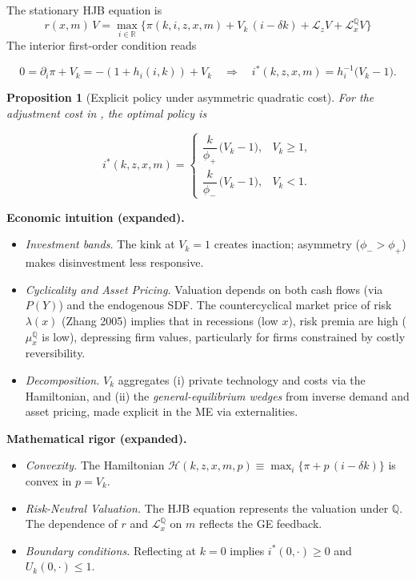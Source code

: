 \documentclass[11pt,letterpaper,oneside]{article}
\providecommand{\ac}[1]{#1}%
\newtheorem{propositionT}{Proposition}
\newenvironment{proposition}[2]{\begin{propositionT}[#1]\label{prop:#2}}{\end{propositionT}}
\newcommand{\R}{\mathbb{R}}
\newcommand{\Lz}{\mathcal{L}_z}
\newcommand{\LxQ}{\mathcal{L}_x^{\mathbb{Q}}}
\newcommand{\muxQ}{\mu_x^{\mathbb{Q}}}
\newcommand{\extbf}[1]{\textbf{#1}}
\begin{document}
The stationary \ac{HJB} equation is
\begin{equation}
\boxed{\; r(x,m)\,V
  = \max_{i\in\R} \Big\{ \pi(k,i,z,x,m) + V_k\,(i-\delta k) + \Lz V + \LxQ V \Big\} \;}
\tag{HJB}\label{eq:HJB}
\end{equation}
The interior first-order condition reads

$$
0=\partial_i\pi+V_k=-(1+h_i(i,k))+V_k
\quad\Longrightarrow\quad
i^*(k,z,x,m)=h_i^{-1}\!\big(V_k-1\big).
$$

\begin{proposition}{Explicit policy under asymmetric quadratic cost}{policy}
For the adjustment cost in , the optimal policy is

$$
i^*(k,z,x,m)=
\begin{cases}
\dfrac{k}{\phi_+}\,\big(V_k-1\big), & V_k\ge 1,\\[6pt]
\dfrac{k}{\phi_-}\,\big(V_k-1\big), & V_k< 1.
\end{cases}
$$
\end{proposition}

\begin{tcolorbox}[didacticstyle]
  \extbf{Economic intuition (expanded).}
\begin{itemize}[leftmargin=1.15em,itemsep=0.25em]
  \item \emph{Investment bands.} The kink at $V_k=1$ creates inaction; asymmetry ($\phi_->\phi_+$) makes disinvestment less responsive.
  \item \emph{Cyclicality and Asset Pricing.} Valuation depends on both cash flows (via $P(Y)$) and the endogenous SDF. The countercyclical market price of risk $\lambda(x)$ (Zhang 2005) implies that in recessions (low $x$), risk premia are high ($\muxQ$ is low), depressing firm values, particularly for firms constrained by costly reversibility.
  \item \emph{Decomposition.} $V_k$ aggregates (i) private technology and costs via the Hamiltonian, and (ii) the \emph{general-equilibrium wedges} from inverse demand and asset pricing, made explicit in the ME via externalities.
\end{itemize}
\end{tcolorbox}

\begin{tcolorbox}[mathstyle]
  \extbf{Mathematical rigor (expanded).}
\begin{itemize}[leftmargin=1.15em,itemsep=0.25em]
  \item \emph{Convexity.} The Hamiltonian $\mathcal{H}(k,z,x,m,p)\equiv \max_{i}\{\pi+p\,(i-\delta k)\}$ is convex in $p=V_k$.
  \item \emph{Risk-Neutral Valuation.} The HJB equation represents the valuation under $\mathbb{Q}$. The dependence of $r$ and $\LxQ$ on $m$ reflects the GE feedback.
  \item \emph{Boundary conditions.} Reflecting at $k=0$ implies $i^*(0,\cdot)\ge0$ and $U_k(0,\cdot)\le1$.
\end{itemize}
\end{tcolorbox}
\end{document}
